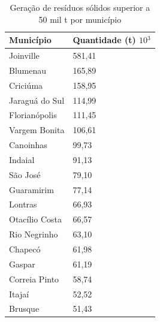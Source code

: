 \begin{table}[htb]
    \ABNTEXfontereduzida
    \centering
    \caption{Geração de resíduos sólidos superior a 50 mil \gls{t} por município  \label{tab:sc-geracao} }
    \begin{tabular}{@{}ll@{}}
    \toprule
    \textbf{Município} & \textbf{Quantidade (\gls{t}) $10{^3}$} \\ \midrule
    Joinville          & 581,41                                        \\
    Blumenau           & 165,89                                        \\
    Criciúma           & 158,95                                        \\
    Jaraguá do Sul     & 114,99                                        \\
    Florianópolis      & 111,45                                        \\
    Vargem Bonita      & 106,61                                        \\
    Canoinhas          & 99,73                                         \\
    Indaial            & 91,13                                         \\
    São José           & 79,10                                         \\
    Guaramirim         & 77,14                                         \\
    Lontras            & 66,93                                         \\
    Otacílio Costa     & 66,57                                         \\
    Rio Negrinho       & 63,10                                         \\
    Chapecó            & 61,98                                         \\
    Gaspar             & 61,19                                         \\
    Correia Pinto      & 58,74                                         \\
    Itajaí             & 52,52                                         \\
    Brusque            & 51,43                                         \\ \bottomrule
    \end{tabular}
    \end{table}

